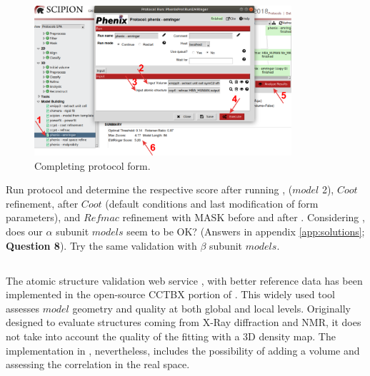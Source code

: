   \begin{figure}[H]
  \centering 
  \captionsetup{width=.7\linewidth} 
  \includegraphics[width=0.85\textwidth]{Images/Fig34}
  \caption{Completing \emringer protocol form.}
  \label{fig:emringer_protocol}
  \end{figure}
 
 Run \emringer protocol and determine the respective score after running , \chimera {} ($model$ 2), $Coot$ refinement, \phenix {} after $Coot$ (default conditions and last modification of form parameters), and $Refmac$ refinement with MASK before and after \phenix {}. Considering \emringer {}, does our  $\alpha$ subunit $models$ seem to be OK? (Answers in appendix \ref{app:solutions}; \textbf{Question 8}). Try the same validation with $\beta$ subunit $models$. \\
 
 \subsection*{\molprobity}
 
 The atomic structure validation web service \molprobity, with better reference data has been implemented in the open-source CCTBX portion of \phenix \citep{williams2018}. This widely used tool assesses $model$ geometry and quality at both global and local levels. Originally designed to evaluate structures coming from X-Ray diffraction and NMR, it does not take into account the quality of the fitting with a 3D density map.  The implementation in \phenix, nevertheless, includes the possibility of adding a volume and assessing the correlation in the real space.\\
 

